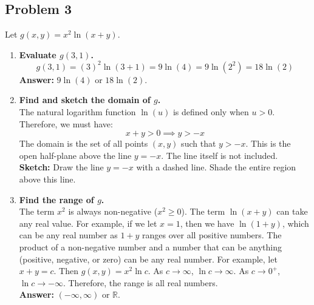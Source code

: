 \documentclass{article}
\begin{document}
\subsection{Problem 3}
Let $g(x, y) = x^2 \ln(x+y)$.
\begin{enumerate}[label=\alph*.]
    \item \textbf{Evaluate $g(3, 1)$.} \\
    \[ g(3, 1) = (3)^2 \ln(3+1) = 9 \ln(4) = 9 \ln(2^2) = 18 \ln(2) \]
    \textbf{Answer:} $9 \ln(4)$ or $18 \ln(2)$.

    \item \textbf{Find and sketch the domain of $g$.} \\
    The natural logarithm function $\ln(u)$ is defined only when $u > 0$. Therefore, we must have:
    \[ x + y > 0 \implies y > -x \]
    The domain is the set of all points $(x, y)$ such that $y > -x$. This is the open half-plane above the line $y = -x$. The line itself is not included. \\
    \textbf{Sketch:} Draw the line $y=-x$ with a dashed line. Shade the entire region above this line.

    \item \textbf{Find the range of $g$.} \\
    The term $x^2$ is always non-negative ($x^2 \ge 0$). The term $\ln(x+y)$ can take any real value. For example, if we let $x=1$, then we have $\ln(1+y)$, which can be any real number as $1+y$ ranges over all positive numbers. The product of a non-negative number and a number that can be anything (positive, negative, or zero) can be any real number. For example, let $x+y=c$. Then $g(x,y)=x^2\ln c$. As $c \to \infty$, $\ln c \to \infty$. As $c \to 0^+$, $\ln c \to -\infty$. Therefore, the range is all real numbers. \\
    \textbf{Answer:} $(-\infty, \infty)$ or $\mathbb{R}$.
\end{enumerate}
\end{document}
